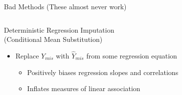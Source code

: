 \documentclass{beamer}\usepackage[]{graphicx}\usepackage[]{color}
\makeatletter
\newenvironment{kframe}{%
 \def\at@end@of@kframe{}%
 \ifinner\ifhmode%
  \def\at@end@of@kframe{\end{minipage}}%
  \begin{minipage}{\columnwidth}%
 \fi\fi%
 \def\FrameCommand##1{\hskip\@totalleftmargin \hskip-\fboxsep
 \colorbox{shadecolor}{##1}\hskip-\fboxsep
     \hskip-\linewidth \hskip-\@totalleftmargin \hskip\columnwidth}%
 \MakeFramed {\advance\hsize-\width
   \@totalleftmargin\z@ \linewidth\hsize
   \@setminipage}}%
 {\par\unskip\endMakeFramed%
 \at@end@of@kframe}
\newenvironment{knitrout}{}{} %
\makeatother
\begin{document}
\begin{frame}{Bad Methods (These almost never work)} 

  \begin{columns}
    \begin{column}{0.5\textwidth}
      
      Deterministic Regression Imputation\\
      (Conditional Mean Substitution)
      \begin{itemize}
      \item Replace $Y_{mis}$ with $\widehat{Y}_{mis}$ from some regression 
        equation
        \begin{itemize}
        \item Positively biases regression slopes and correlations
        \item Inflates measures of linear association
        \end{itemize}
      \end{itemize}
      
    \end{column}
    \begin{column}{0.5\textwidth}
      
\begin{knitrout}\footnotesize
{}\color{fgcolor}\begin{kframe}


{\ttfamily\noindent\bfseries\color{errorcolor}{Error in check.dataform(data): object 'dat2' not found}}

{\ttfamily\noindent\bfseries\color{errorcolor}{Error in complete(miceD, 1): object 'miceD' not found}}

{\ttfamily\noindent\bfseries\color{errorcolor}{Error in datD[!rVec, ] <- NA: object 'datD' not found}}

{\ttfamily\noindent\bfseries\color{errorcolor}{Error in FUN(X[[i]], ...): object 'dat2' not found}}\end{kframe}


\end{knitrout}
\end{column}
\end{columns}
\end{frame}
\end{document}
